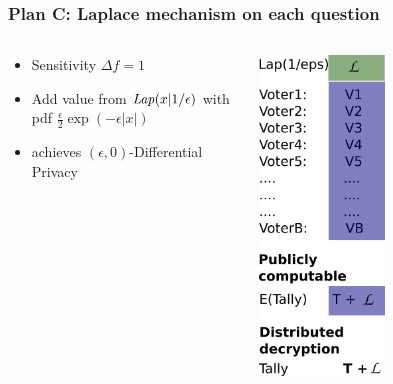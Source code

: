 \documentclass[10pt,xcolor=svgnames,169]{beamer} %
\begin{document}
\begin{frame}
	\frametitle{Plan C: Laplace mechanism on each question}
		\begin{columns}
	\begin{column}{0.7\textwidth}
	\begin{itemize}
		\item Sensitivity $\Delta f = 1$
		\item Add value from $\mathit{Lap}(x | 1/\epsilon)$ with pdf $ \frac{\epsilon}{2} \exp (- \epsilon |x|)$
		\item achieves $(\epsilon,0)$-Differential Privacy 
	\end{itemize}

		
	\end{column}
	\begin{column}{0.3\textwidth}  %
		\begin{center}
			\includegraphics[width=0.5\textwidth]{homomorphicAddition_Laplace}
		\end{center}
	\end{column}
\end{columns}

\end{frame}
\end{document}

